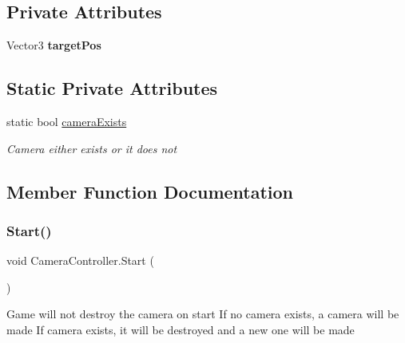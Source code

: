 \subsection*{Private Attributes}
\begin{DoxyCompactItemize}
\item 
\mbox{\label{class_camera_controller_a2184f9f0312b1966a136d765abcf1a59}} 
Vector3 {\bfseries target\+Pos}
\end{DoxyCompactItemize}
\subsection*{Static Private Attributes}
\begin{DoxyCompactItemize}
\item 
static bool \mbox{\hyperlink{class_camera_controller_a2569b5df8af02ceb1c47be482616b638}{camera\+Exists}}
\begin{DoxyCompactList}\small\item\em Camera either exists or it does not \end{DoxyCompactList}\end{DoxyCompactItemize}


\subsection{Member Function Documentation}
\mbox{\label{class_camera_controller_ad4a238c6f7db3ee003302a245d860860}} 
\subsubsection{\texorpdfstring{Start()}{Start()}}
{\footnotesize\ttfamily void Camera\+Controller.\+Start (\begin{DoxyParamCaption}{ }\end{DoxyParamCaption})\hspace{0.3cm}{\ttfamily [private]}}



Game will not destroy the camera on start If no camera exists, a camera will be made If camera exists, it will be destroyed and a new one will be made 

\mbox{\label{class_camera_controller_a7c4f486f4bcbd1d54a346fdce9707bd5}} 
